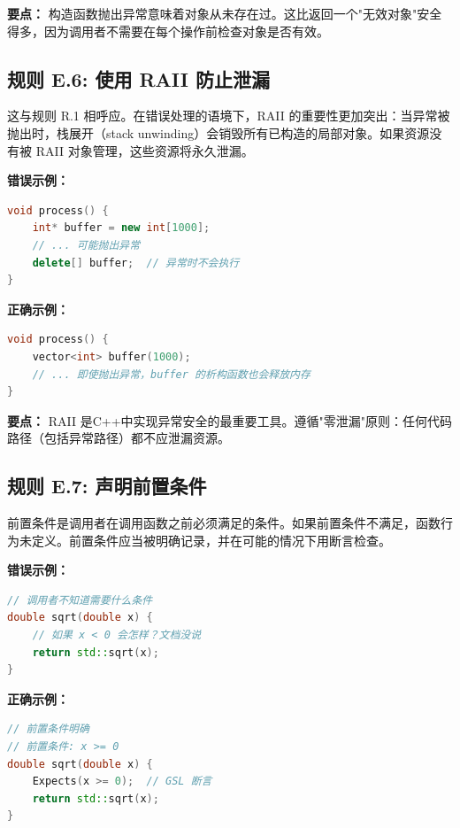 \textbf{要点：} 构造函数抛出异常意味着对象从未存在过。这比返回一个"无效对象"安全得多，因为调用者不需要在每个操作前检查对象是否有效。

\subsection*{\textbf{规则 E.6:} 使用 RAII 防止泄漏}

这与规则 R.1 相呼应。在错误处理的语境下，RAII 的重要性更加突出：当异常被抛出时，栈展开（stack unwinding）会销毁所有已构造的局部对象。如果资源没有被 RAII 对象管理，这些资源将永久泄漏。

\textbf{错误示例：}

\begin{lstlisting}[language=C++]
void process() {
    int* buffer = new int[1000];
    // ... 可能抛出异常
    delete[] buffer;  // 异常时不会执行
}
\end{lstlisting}

\textbf{正确示例：}

\begin{lstlisting}[language=C++]
void process() {
    vector<int> buffer(1000);
    // ... 即使抛出异常，buffer 的析构函数也会释放内存
}
\end{lstlisting}

\textbf{要点：} RAII 是C++中实现异常安全的最重要工具。遵循"零泄漏"原则：任何代码路径（包括异常路径）都不应泄漏资源。

\subsection*{\textbf{规则 E.7:} 声明前置条件}

前置条件是调用者在调用函数之前必须满足的条件。如果前置条件不满足，函数行为未定义。前置条件应当被明确记录，并在可能的情况下用断言检查。

\textbf{错误示例：}

\begin{lstlisting}[language=C++]
// 调用者不知道需要什么条件
double sqrt(double x) {
    // 如果 x < 0 会怎样？文档没说
    return std::sqrt(x);
}
\end{lstlisting}

\textbf{正确示例：}

\begin{lstlisting}[language=C++]
// 前置条件明确
// 前置条件: x >= 0
double sqrt(double x) {
    Expects(x >= 0);  // GSL 断言
    return std::sqrt(x);
}
\end{lstlisting}

